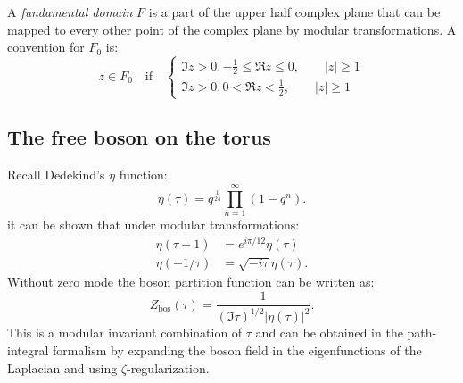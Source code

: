 \documentclass[submission, PhysLectNotes]{SciPost}
\begin{document}
A \emph{fundamental domain} $F$ is a part of the upper half complex plane that can be mapped to every other point of the complex plane by modular transformations. A convention for $F_0$ is:
\begin{equation}
	z\in F_0\quad\text{if}\quad
	\begin{cases}
		\Im z > 0, -\frac{1}{2}\leq \Re z\leq 0, \qquad|z|\geq 1\\
		\Im z > 0, 0< \Re z<\frac{1}{2},\qquad |z|\geq 1
	\end{cases}
\end{equation}
\subsection{The free boson on the torus}
Recall Dedekind's $\eta$ function:
\begin{equation}
	\eta(\tau) = q^{\frac{1}{24}}\prod_{n=1}^\infty (1-q^n).
\end{equation}
it can be shown that under modular transformations:
\begin{align}
	\eta(\tau+1) &= e^{i\pi/12}\eta(\tau)\\
	\eta(-1/\tau) &= \sqrt{-i\tau}\eta(\tau).
\end{align}
Without zero mode the boson partition function can be written as:
\begin{equation}
	Z_{\text{bos}}(\tau) = \frac{1}{{(\Im\tau)}^{1/2}|\eta(\tau)|^2}.
\end{equation}
This is a modular invariant combination of $\tau$ and can be obtained in the path-integral formalism by expanding the boson field in the eigenfunctions of the Laplacian and using $\zeta$-regularization.
\end{document}
